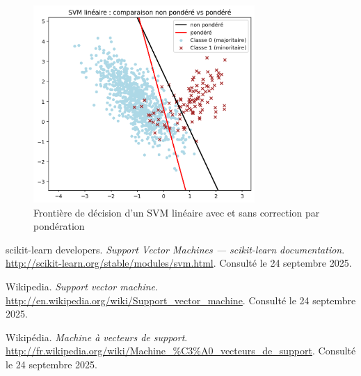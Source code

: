 \documentclass[
  12pt,
]{article}
\begin{document}
\begin{figure}[H]
    \centering
    \includegraphics[width=0.75\textwidth]{vis/pond.png}
    \caption{Frontière de décision d’un SVM linéaire avec et sans correction par pondération}
    \label{fig:avec_sans_pondération}
\end{figure}

\begin{thebibliography}{9}

scikit-learn developers.  
\textit{Support Vector Machines — scikit-learn documentation}.  
\url{http://scikit-learn.org/stable/modules/svm.html}.  
Consulté le 24 septembre 2025.

Wikipedia.  
\textit{Support vector machine}.  
\url{http://en.wikipedia.org/wiki/Support_vector_machine}.  
Consulté le 24 septembre 2025.

Wikipédia.  
\textit{Machine à vecteurs de support}.  
\url{http://fr.wikipedia.org/wiki/Machine_%C3%A0_vecteurs_de_support}.  %
Consulté le 24 septembre 2025.

\end{thebibliography}
\end{document}
